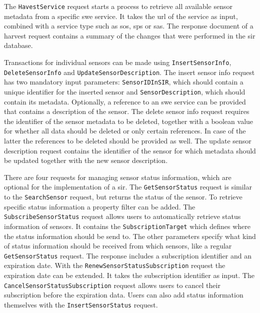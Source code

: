 The \texttt{HavestService} request starts a process to retrieve all available sensor metadata from a specific \ac{swe} service. It takes the \ac{url} of the service as input, combined with a service type such as \ac{sos}, \ac{sps} or \ac{sas}. The response document of a harvest request contains a summary of the changes that were performed in the \ac{sir} database.

Transactions for individual sensors can be made using \texttt{InsertSensorInfo}, \texttt{DeleteSensorInfo}  and \texttt{UpdateSensorDescription}. The insert sensor info request has two mandatory input parameters: \texttt{SensorIDInSIR}, which should contain a unique identifier for the inserted sensor and \texttt{SensorDescription}, which should contain its metadata. Optionally, a reference to an \ac{swe} service can be provided that contains a description of the sensor. The delete sensor info request requires the identifier of the sensor metadata to be deleted, together with a boolean value for whether all data should be deleted or only certain references. In case of the latter the references to be deleted should be provided as well. The update sensor description request contains the identifier of the sensor for which metadata should be updated together with the new sensor description. 

\begin{sloppypar}
	There are four requests for managing sensor status information, which are optional for the implementation of a \ac{sir}. The \texttt{GetSensorStatus} request is similar to the \texttt{SearchSensor} request, but returns the status of the sensor. To retrieve specific status information a property filter can be added. The \texttt{SubscribeSensorStatus} request allows users to automatically retrieve status information of sensors. It contains the \texttt{SubscriptionTarget} which defines where the status information should be send to. The other parameters specify what kind of status information should be received from which sensors, like a regular \texttt{GetSensorStatus} request. The response includes a subscription identifier and an expiration date. With the \texttt{RenewSensorStatusSubscription} request the expiration date can be extended. It takes the subscription identifier as input. The \texttt{CancelSensorStatusSubscription} request allows users to cancel their subscription before the expiration data. Users can also add status information themselves with the \texttt{InsertSensorStatus} request.    
\end{sloppypar}

